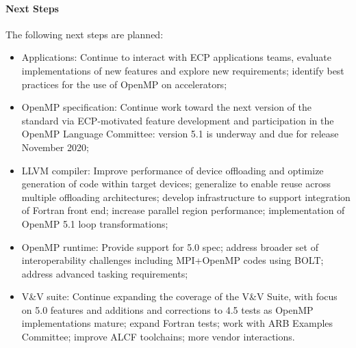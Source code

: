 \paragraph{Next Steps}
The following next steps are planned:
\begin{itemize}
\item Applications: Continue to interact with ECP applications teams, evaluate implementations of new features and explore new requirements; identify best practices for the use of OpenMP on accelerators;

\item OpenMP specification: Continue work toward the next version of the standard via ECP-motivated feature development and participation in the OpenMP Language Committee: version 5.1 is underway and due for release November 2020;

\item LLVM compiler: Improve performance of device offloading and optimize generation of code within target devices; generalize to enable reuse across multiple offloading architectures; develop infrastructure to support integration of Fortran front end; increase parallel region performance; implementation of OpenMP 5.1 loop transformations;

\item OpenMP runtime: Provide support for 5.0 spec; address broader set of interoperability challenges including MPI+OpenMP codes using BOLT; address advanced tasking requirements; 

\item V\&V suite: Continue expanding the coverage of the V\&V Suite, with focus on 5.0 features and additions and corrections to 4.5 tests as OpenMP implementations mature; expand Fortran tests; work with ARB Examples Committee; improve ALCF toolchains; more vendor interactions.
\end{itemize} 


